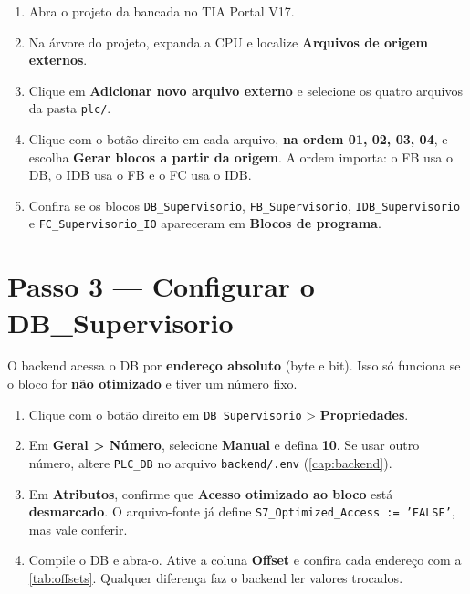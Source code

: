 \documentclass[12pt, oneside, a4paper, chapter=TITLE, section=TITLE, english, brazil]{abntex2}
\begin{document}
\begin{enumerate}[label=\arabic*.]
  \item Abra o projeto da bancada no TIA Portal V17.
  \item Na árvore do projeto, expanda a CPU e localize \textbf{Arquivos de origem externos}.
  \item Clique em \textbf{Adicionar novo arquivo externo} e selecione os quatro arquivos da pasta \texttt{plc/}.
  \item Clique com o botão direito em cada arquivo, \textbf{na ordem 01, 02, 03, 04}, e escolha \textbf{Gerar blocos a partir da origem}. A ordem importa: o FB usa o DB, o IDB usa o FB e o FC usa o IDB.
  \item Confira se os blocos \texttt{DB\_Supervisorio}, \texttt{FB\_Supervisorio}, \texttt{IDB\_Supervisorio} e \texttt{FC\_Supervisorio\_IO} apareceram em \textbf{Blocos de programa}.
\end{enumerate}

\chapter{Passo 3 --- Configurar o DB\_Supervisorio}

O backend acessa o DB por \textbf{endereço absoluto} (byte e bit). Isso só funciona se o bloco for \textbf{não otimizado} e tiver um número fixo.

\begin{enumerate}[label=\arabic*.]
  \item Clique com o botão direito em \texttt{DB\_Supervisorio} > \textbf{Propriedades}.
  \item Em \textbf{Geral > Número}, selecione \textbf{Manual} e defina \textbf{10}. Se usar outro número, altere \texttt{PLC\_DB} no arquivo \texttt{backend/.env} (\autoref{cap:backend}).
  \item Em \textbf{Atributos}, confirme que \textbf{Acesso otimizado ao bloco} está \textbf{desmarcado}. O arquivo-fonte já define \texttt{S7\_Optimized\_Access := 'FALSE'}, mas vale conferir.
  \item Compile o DB e abra-o. Ative a coluna \textbf{Offset} e confira cada endereço com a \autoref{tab:offsets}. Qualquer diferença faz o backend ler valores trocados.
\end{enumerate}
\end{document}
